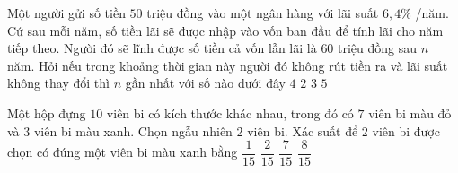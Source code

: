 \begin{ex}%
	Một người gửi số tiền $50$ triệu đồng vào một ngân hàng với lãi suất $6,4\%$ /năm. Cứ sau mỗi năm, số tiền lãi sẽ được nhập vào vốn ban đầu để tính lãi cho năm tiếp theo. Người đó sẽ lĩnh được số tiền cả vốn lẫn lãi là $60$ triệu đồng sau $n$ năm. Hỏi nếu trong khoảng thời gian này người đó không rút tiền ra và lãi suất không thay đổi thì $n$ gần nhất với số nào dưới đây
	\choice
	{$4$}
	{$2$}
	{\True $3$}
	{$5$}
\end{ex}

\begin{ex}%
	Một hộp đựng $10$ viên bi có kích thước khác nhau, trong đó có $7$ viên bi màu đỏ và $3$ viên bi màu xanh. Chọn ngẫu nhiên $2$ viên bi. Xác suất để $2$ viên bi được chọn có đúng một viên bi màu xanh bằng
	\choice
	{$\dfrac{1}{15}$}
	{$\dfrac{2}{15}$}
	{\True $\dfrac{7}{15}$}
	{$\dfrac{8}{15}$}
\end{ex}

